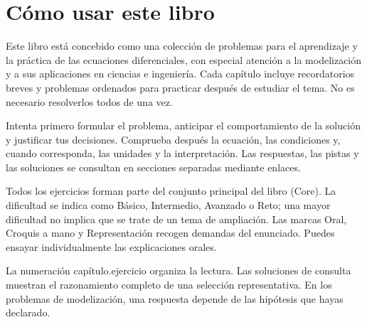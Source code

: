 

\frontmatter


\chapter*{Cómo usar este libro}
Este libro está concebido como una colección de problemas para el aprendizaje y la práctica de las ecuaciones diferenciales, con especial atención a la modelización y a sus aplicaciones en ciencias e ingeniería. Cada capítulo incluye recordatorios breves y problemas ordenados para practicar después de estudiar el tema. No es necesario resolverlos todos de una vez.

Intenta primero formular el problema, anticipar el comportamiento de la solución y justificar tus decisiones. Comprueba después la ecuación, las condiciones y, cuando corresponda, las unidades y la interpretación. Las respuestas, las pistas y las soluciones se consultan en secciones separadas mediante enlaces.

Todos los ejercicios forman parte del conjunto principal del libro (Core). La dificultad se indica como Básico, Intermedio, Avanzado o Reto; una mayor dificultad no implica que se trate de un tema de ampliación. Las marcas Oral, Croquis a mano y Representación recogen demandas del enunciado. Puedes ensayar individualmente las explicaciones orales.

La numeración capítulo.ejercicio organiza la lectura. Las soluciones de consulta muestran el razonamiento completo de una selección representativa. En los problemas de modelización, una respuesta depende de las hipótesis que hayas declarado.
\tableofcontents\mainmatter

\backmatter


